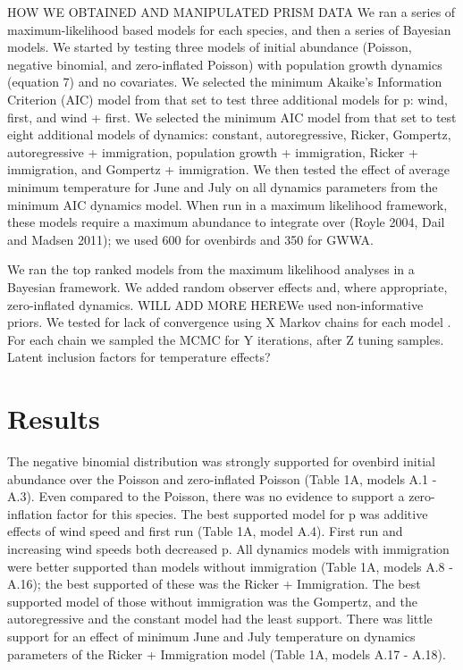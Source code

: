 \documentclass[12pt]{article}
\begin{document}
HOW WE OBTAINED AND MANIPULATED PRISM DATA
We ran a series of maximum-likelihood based models for each species,
and then a series of Bayesian models.  We started by testing three
models of initial abundance (Poisson, negative binomial, and
zero-inflated Poisson) with population growth dynamics (equation 7)
and no covariates.  We selected the minimum Akaike's Information
Criterion (AIC) model from that set to test three additional models
for p: wind, first, and wind + first.   We selected the minimum AIC
model from that set to test eight additional models of dynamics:
constant, autoregressive, Ricker, Gompertz, autoregressive +
immigration, population growth + immigration, Ricker + immigration,
and Gompertz + immigration.  We then tested the effect of average
minimum temperature for June and July on all dynamics parameters from
the minimum AIC dynamics model.  When run in a maximum likelihood
framework, these models require a maximum abundance to integrate over
(Royle 2004, Dail and Madsen 2011); we used 600 for ovenbirds and 350
for GWWA.

We ran the top ranked models from the maximum likelihood analyses in a
Bayesian framework.  We added random observer effects and, where
appropriate, zero-inflated dynamics.  WILL ADD MORE HEREWe used
non-informative priors.  We tested for lack of convergence using X
Markov chains for each model \citep{gelman_rubin:1992}.
For each chain
we sampled the MCMC for Y iterations, after Z tuning samples.  Latent
inclusion factors for temperature effects?

\section{Results}

The negative binomial distribution was strongly supported for ovenbird
initial abundance over the Poisson and zero-inflated Poisson (Table
1A, models A.1 - A.3).  Even compared to the Poisson, there was no
evidence to support a zero-inflation factor for this species.  The
best supported model for p was additive effects of wind speed and
first run (Table 1A, model A.4).  First run and increasing wind speeds
both decreased p.  All dynamics models with immigration were better
supported than models without immigration (Table 1A, models A.8 -
A.16); the best supported of these was the Ricker + Immigration.  The
best supported model of those without immigration was the Gompertz,
and the autoregressive and the constant model had the least support.
There was little support for an effect of minimum June and July
temperature on dynamics parameters of the Ricker + Immigration model
(Table 1A, models A.17 - A.18).
\end{document}
